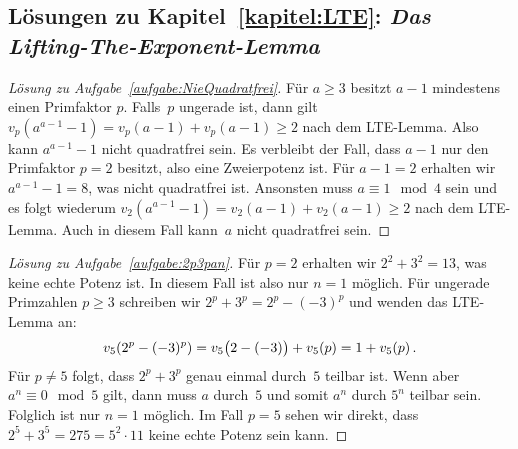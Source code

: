 \subsection*{Lösungen zu Kapitel~\ref{kapitel:LTE}: \emph{Das Lifting-The-Exponent-Lemma}}

\begin{proof}[Lösung zu Aufgabe~\ref{aufgabe:NieQuadratfrei}]
	Für $a\geqslant 3$ besitzt $a-1$ mindestens einen Primfaktor $p$. Falls~$p$ ungerade ist, dann gilt $v_p(a^{a-1}-1)=v_p(a-1)+v_p(a-1)\geqslant 2$ nach dem LTE-Lemma. Also kann $a^{a-1}-1$ nicht quadratfrei sein. Es verbleibt der Fall, dass $a-1$ nur den Primfaktor $p=2$ besitzt, also eine Zweierpotenz ist. Für $a-1=2$ erhalten wir $a^{a-1}-1=8$, was nicht quadratfrei ist. Ansonsten muss $a\equiv 1\mod 4$ sein und es folgt wiederum $v_2(a^{a-1}-1)=v_2(a-1)+v_2(a-1)\geqslant 2$ nach dem LTE-Lemma. Auch in diesem Fall kann~$a$ nicht quadratfrei sein.
\end{proof}

\begin{proof}[Lösung zu Aufgabe~\ref{aufgabe:2p3pan}]
	Für $p=2$ erhalten wir $2^2+3^2=13$, was keine echte Potenz ist. In diesem Fall ist also nur $n=1$ möglich. Für ungerade Primzahlen $p\geqslant 3$ schreiben wir $2^p+3^p=2^p-(-3)^p$ und wenden das LTE-Lemma an:
	\begin{equation*}
		v_5\parens*{2^p-(-3)^p}=v_5\parens[\big]{2-(-3)}+v_5(p)=1+v_5(p)\,.
	\end{equation*}
	Für $p\neq 5$ folgt, dass $2^p+3^p$ genau einmal durch~$5$ teilbar ist. Wenn aber $a^n\equiv 0\mod 5$ gilt, dann muss $a$ durch~$5$ und somit $a^n$ durch $5^n$ teilbar sein. Folglich ist nur $n=1$ möglich. Im Fall $p=5$ sehen wir direkt, dass $2^5+3^5=275=5^2\cdot 11$ keine echte Potenz sein kann.
\end{proof}

